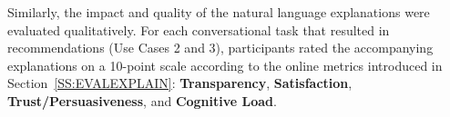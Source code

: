 Similarly, the impact and quality of the natural language explanations were evaluated qualitatively. For each conversational task that resulted in recommendations (Use Cases 2 and 3), participants rated the accompanying explanations on a 10-point scale according to the online metrics introduced in Section~\ref{SS:EVALEXPLAIN}: \textbf{Transparency}, \textbf{Satisfaction}, \textbf{Trust/Persuasiveness}, and \textbf{Cognitive Load}.
